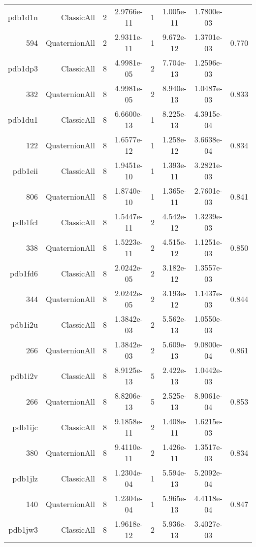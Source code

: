 \begin{xltabular}{\textwidth}{r|rcS[table-format=1.4e+2]cS[table-format=1.3e+2]S[table-format=1.4e+2]S[table-format=-1.3]}
pdb1d1n & ClassicAll & 2 & 2.9766e-11 & 1 & 1.005e-11 & 1.7800e-03 & \\
594 & QuaternionAll & 2 & 2.9311e-11 & 1 & 9.672e-12 & 1.3701e-03 & 0.770\\  \addlinespace
pdb1dp3 & ClassicAll & 8 & 4.9981e-05 & 2 & 7.704e-13 & 1.2596e-03 & \\
332 & QuaternionAll & 8 & 4.9981e-05 & 2 & 8.940e-13 & 1.0487e-03 & 0.833\\  \addlinespace
pdb1du1 & ClassicAll & 8 & 6.6600e-13 & 1 & 8.225e-13 & 4.3915e-04 & \\
122 & QuaternionAll & 8 & 1.6577e-12 & 1 & 1.258e-12 & 3.6638e-04 & 0.834\\  \addlinespace
pdb1eii & ClassicAll & 8 & 1.9451e-10 & 1 & 1.393e-11 & 3.2821e-03 & \\
806 & QuaternionAll & 8 & 1.8740e-10 & 1 & 1.365e-11 & 2.7601e-03 & 0.841\\  \addlinespace
pdb1fcl & ClassicAll & 8 & 1.5447e-11 & 2 & 4.542e-12 & 1.3239e-03 & \\
338 & QuaternionAll & 8 & 1.5223e-11 & 2 & 4.515e-12 & 1.1251e-03 & 0.850\\  \addlinespace
pdb1fd6 & ClassicAll & 8 & 2.0242e-05 & 2 & 3.182e-12 & 1.3557e-03 & \\
344 & QuaternionAll & 8 & 2.0242e-05 & 2 & 3.193e-12 & 1.1437e-03 & 0.844\\  \addlinespace
pdb1i2u & ClassicAll & 8 & 1.3842e-03 & 2 & 5.562e-13 & 1.0550e-03 & \\
266 & QuaternionAll & 8 & 1.3842e-03 & 2 & 5.609e-13 & 9.0800e-04 & 0.861\\  \addlinespace
pdb1i2v & ClassicAll & 8 & 8.9125e-13 & 5 & 2.422e-13 & 1.0442e-03 & \\
266 & QuaternionAll & 8 & 8.8206e-13 & 5 & 2.525e-13 & 8.9061e-04 & 0.853\\  \addlinespace
pdb1ijc & ClassicAll & 8 & 9.1858e-11 & 2 & 1.408e-11 & 1.6215e-03 & \\
380 & QuaternionAll & 8 & 9.4110e-11 & 2 & 1.426e-11 & 1.3517e-03 & 0.834\\  \addlinespace
pdb1jlz & ClassicAll & 8 & 1.2304e-04 & 1 & 5.594e-13 & 5.2092e-04 & \\
140 & QuaternionAll & 8 & 1.2304e-04 & 1 & 5.965e-13 & 4.4118e-04 & 0.847\\  \addlinespace
pdb1jw3 & ClassicAll & 8 & 1.9618e-12 & 2 & 5.936e-13 & 3.4027e-03 & \\

\end{xltabular}
